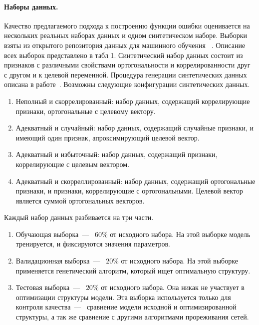 \documentclass[12pt, twoside]{article}
\begin{document}
\paragraph{Наборы данных.}
Качество предлагаемого подхода к построению функции ошибки оценивается на нескольких реальных наборах данных и одном синтетическом наборе. Выборки взяты из открытого репозитория данных для машинного обучения ~\cite{seventh}.  Описание всех выборок представлено в табл 1. Синтетический набор данных состоит из признаков с различными свойствами ортогональности и коррелированности друг с другом и к целевой переменной. Процедура генерации синтетических данных описана в работе~\cite{katrutsa2015stress}. Возможны следующие конфигурации синтетических данных.
 \begin{enumerate}
 \item  Неполный и скоррелированный: набор данных, содержащий коррелирующие признаки, ортогональные с целевому вектору.
 \item  Адекватный и случайный: набор данных, содержащий случайные признаки, и имеющий один признак, апроксимирующий целевой вектор.
 \item Адекватный и избыточный: набор данных, содержащий признаки, коррелирующие с целевым вектором.
 \item Адекватный и скорреллированный: набор данных, содержащий ортогональные признаки, и признаки, коррелирующие с ортогональными. Целевой вектор является суммой ортогональных векторов.
 \end{enumerate}
Каждый набор данных разбивается на три части.
\begin{enumerate}
 \item  Обучающая выборка~---~ $60\%$ от исходного набора. На этой выборке модель тренируется, и фиксируются значения параметров. 
 \item  Валидационная выборка~---~ $20\%$ от исходного набора. На этой выборке применяется генетический алгоритм, который ищет оптимальную структуру.
 \item Тестовая выборка~---~ $20\%$ от исходного набора. Она никак не участвует в оптимизации структуры модели. Эта выборка используется только для контроля качества~---~ сравнение модели исходной и оптимизированной структуры, а так же сравнение с другими алгоритмами прореживания сетей. 
 \end{enumerate}
\end{document}
